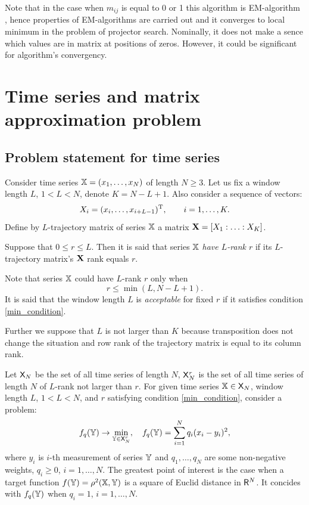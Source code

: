 \documentclass[12pt,a4paper,fleqn,leqno]{article}
\begin{document}
Note that in the case when $m_{ij}$ is equal to 0 or 1 this algorithm is EM-algorithm \cite{Srebro2003},
hence properties of EM-algorithms are carried out and it converges to local minimum in the problem of projector search. Nominally, it does not make a sence which values are in matrix at positions of zeros. However, it could be significant for algorithm's convergency.

\section{Time series and matrix approximation problem}
\label{sec:ts_matrices}
\subsection{Problem statement for time series}
Consider time series $\mathbb{X} = (x_1, \ldots, x_N)$ of length $N \ge 3$. Let us fix a window length $L$, $1 < L < N$, denote $K = N - L + 1$. Also consider a sequence of vectors:
\begin{equation}\label{l_lagged}
X_i = (x_i, \ldots, x_{i + L - 1})^{\mathrm{T}}, \qquad i = 1, \ldots, K.
\end{equation}
Define by $L$-trajectory matrix of series $\mathbb{X}$ a matrix $\mathbf{X} = [X_1:\ldots:X_K]$.

\begin{definition}
Suppose that $0 \le r \le L$. Then it is said that series $\mathbb{X}$ \emph{have $L$-rank $r$} if its $L$-trajectory matrix's $\mathbf{X}$ rank equals $r$.
\end{definition}

Note that series $\mathbb{X}$ could have $L$-rank $r$ only when
\begin{equation}
r \le \min(L, N-L+1). \label{min_condition}
\end{equation}
It is said that the window length $L$ is \emph{acceptable} for fixed $r$ if it satisfies condition \eqref{min_condition}.

Further we suppose that $L$ is not larger than $K$ because transposition does not change the situation and row rank of the trajectory matrix is equal to its column rank.

Let $\mathsf{X}_N$ be the set of all time series of length $N$, $\mathsf{X}_N^r$ is the set of all time series of length $N$ of $L$-rank not larger than $r$. For given time series $\mathbb{X} \in \mathsf{X}_N$, window length $L$, $1 < L < N$, and $r$ satisfying condition \eqref{min_condition}, consider a problem:
\begin{equation} \label{L-rank_task}
f_q(\mathbb{Y}) \to \min_{\mathbb{Y} \in \mathsf{X}_N^r}, \quad f_q(\mathbb{Y}) = \sum \limits_{i=1}^N q_i(x_i - y_i)^2,
\end{equation}
where $y_i$ is $i$-th measurement of series $\mathbb{Y}$ and $q_1, \ldots, q_N$ are some non-negative weights,
$q_i \ge 0$, $i = 1, \ldots, N$. The greatest point of interest is the case when a target function $f(\mathbb{Y}) = \rho^2(\mathbb{X}, \mathbb{Y})$ is a square of Euclid distance in $\mathsf{R}^N$. It concides with $f_q(\mathbb{Y})$ when $q_i = 1$, $i = 1, \ldots, N$.
\end{document}
